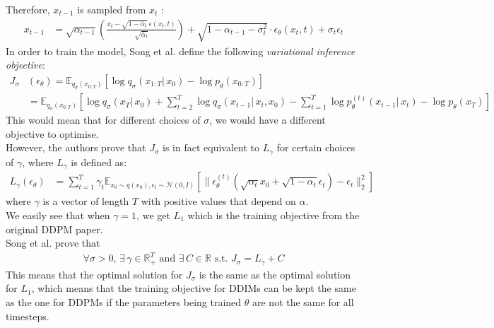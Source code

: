\documentclass[twoside]{article}
\numberwithin{equation}{section}
\numberwithin{figure}{section}
\begin{document}
Therefore, $x_{t-1}$ is sampled from $x_t$ \cite{song2022denoising}: 
\begin{align}
  x_{t-1} &= \sqrt{\alpha_{t-1}} \left( \frac{x_t - \sqrt{1 - \bar{\alpha}_t} \: \epsilon(x_t, t)}{\sqrt{\bar{\alpha}_t}} \right) + \sqrt{1 - \alpha_{t-1} - \sigma_t^2} \cdot \epsilon_\theta (x_t, t) + \sigma_t \epsilon_t
\end{align}
In order to train the model, Song et al. \cite{song2022denoising} define the following \textit{variational inference objective}:
\begin{align}
  J_\sigma & (\epsilon_\theta) = \mathbb{E}_{q_\sigma (x_{0:T})} \left[ \log q_\sigma (x_{1:T} | \, x_0) - \log p_\theta (x_{0:T}) \right] \\
  &= \mathbb{E}_{q_\sigma (x_{0:T})} \left[ \log q_\sigma (x_T | \, x_0) + \sum_{t=2}^{T} \log q_\sigma (x_{t-1} | \, x_t, x_0) - \sum_{t=1}^{T} \log p_\theta^{(t)} (x_{t-1} | \, x_t) - \log p_\theta (x_T) \right]
\end{align}
This would mean that for different choices of $\sigma$, we would have a different objective to optimise. \cite{song2022denoising} \\
However, the authors \cite{song2022denoising} prove that $J_\sigma$ is in fact equivalent to $L_\gamma$ for certain choices of $\gamma$, where $L_\gamma$ is defined as:
\begin{align}
  L_\gamma (\epsilon_\theta) &= \sum_{t=1}^{T} \gamma_t \mathbb{E}_{x_0 \sim q(x_0), \epsilon_t \sim \mathcal{N}(0, I)}  \left[ \| \epsilon_\theta^{(t)} (\sqrt{\alpha_t} x_0 + \sqrt{1 - \alpha_t} \epsilon_t) - \epsilon_t \|_2^2 \right]
\end{align}
where $\gamma$ is a vector of length $T$ with positive values that depend on $\alpha$. \\
We easily see that when $\gamma = 1$, we get $L_1$ which is the training objective from the original DDPM paper. \cite{ho2020denoising, song2022denoising} \\
Song et al. prove that
\begin{align}
  \forall \sigma > 0, \, \exists \, \gamma \in \mathbb{R}_+^T \text{ and } \exists \, C \in \mathbb{R} \text{ s.t. } J_\sigma = L_\gamma + C
\end{align}
This means that the optimal solution for $J_\sigma$ is the same as the optimal solution for $L_1$, which means that the training objective for DDIMs can be kept the same as the one for DDPMs if the parameters being trained $\theta$ are not the same for all timesteps. \cite{song2022denoising}
\end{document}
